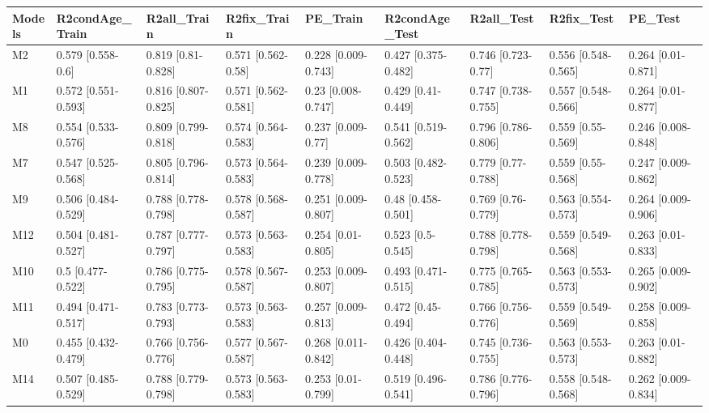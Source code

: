 \begin{table}[ht]
\centering
\begin{tabular}{lllllllll}
  \hline
Models & R2condAge\_Train & R2all\_Train & R2fix\_Train & PE\_Train & R2condAge\_Test & R2all\_Test & R2fix\_Test & PE\_Test \\ 
  \hline
M2 & 0.579 [0.558-0.6] & 0.819 [0.81-0.828] & 0.571 [0.562-0.58] & 0.228 [0.009-0.743] & 0.427 [0.375-0.482] & 0.746 [0.723-0.77] & 0.556 [0.548-0.565] & 0.264 [0.01-0.871] \\ 
  M1 & 0.572 [0.551-0.593] & 0.816 [0.807-0.825] & 0.571 [0.562-0.581] & 0.23 [0.008-0.747] & 0.429 [0.41-0.449] & 0.747 [0.738-0.755] & 0.557 [0.548-0.566] & 0.264 [0.01-0.877] \\ 
  M8 & 0.554 [0.533-0.576] & 0.809 [0.799-0.818] & 0.574 [0.564-0.583] & 0.237 [0.009-0.77] & 0.541 [0.519-0.562] & 0.796 [0.786-0.806] & 0.559 [0.55-0.569] & 0.246 [0.008-0.848] \\ 
  M7 & 0.547 [0.525-0.568] & 0.805 [0.796-0.814] & 0.573 [0.564-0.583] & 0.239 [0.009-0.778] & 0.503 [0.482-0.523] & 0.779 [0.77-0.788] & 0.559 [0.55-0.568] & 0.247 [0.009-0.862] \\ 
  M9 & 0.506 [0.484-0.529] & 0.788 [0.778-0.798] & 0.578 [0.568-0.587] & 0.251 [0.009-0.807] & 0.48 [0.458-0.501] & 0.769 [0.76-0.779] & 0.563 [0.554-0.573] & 0.264 [0.009-0.906] \\ 
  M12 & 0.504 [0.481-0.527] & 0.787 [0.777-0.797] & 0.573 [0.563-0.583] & 0.254 [0.01-0.805] & 0.523 [0.5-0.545] & 0.788 [0.778-0.798] & 0.559 [0.549-0.568] & 0.263 [0.01-0.833] \\ 
  M10 & 0.5 [0.477-0.522] & 0.786 [0.775-0.795] & 0.578 [0.567-0.587] & 0.253 [0.009-0.807] & 0.493 [0.471-0.515] & 0.775 [0.765-0.785] & 0.563 [0.553-0.573] & 0.265 [0.009-0.902] \\ 
  M11 & 0.494 [0.471-0.517] & 0.783 [0.773-0.793] & 0.573 [0.563-0.583] & 0.257 [0.009-0.813] & 0.472 [0.45-0.494] & 0.766 [0.756-0.776] & 0.559 [0.549-0.569] & 0.258 [0.009-0.858] \\ 
  M0 & 0.455 [0.432-0.479] & 0.766 [0.756-0.776] & 0.577 [0.567-0.587] & 0.268 [0.011-0.842] & 0.426 [0.404-0.448] & 0.745 [0.736-0.755] & 0.563 [0.553-0.573] & 0.263 [0.01-0.882] \\ 
  M14 & 0.507 [0.485-0.529] & 0.788 [0.779-0.798] & 0.573 [0.563-0.583] & 0.253 [0.01-0.799] & 0.519 [0.496-0.541] & 0.786 [0.776-0.796] & 0.558 [0.548-0.568] & 0.262 [0.009-0.834] \\ 
   \hline
\end{tabular}
\end{table}
